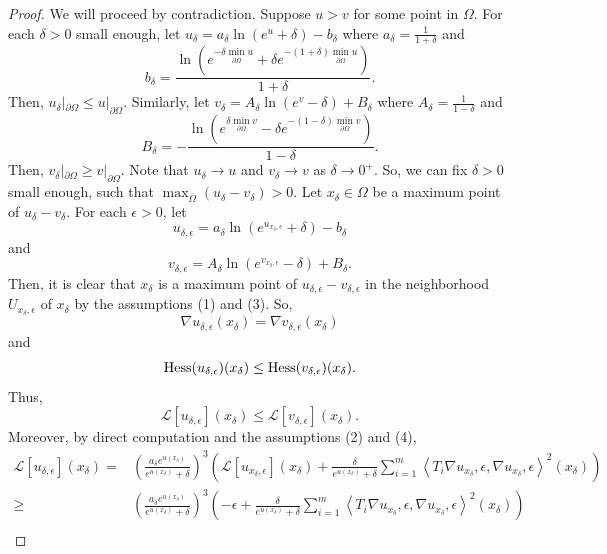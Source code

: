 \documentclass[12pt]{amsart}
\def\ol{\overline}
\def\e{\epsilon}
\def\p{\partial}
\def\ol{\overline}
\def\vv<#1,#2>{\left\langle#1,#2\right\rangle}
\theoremstyle{definition}
\theoremstyle{remark}
\numberwithin{equation}{section}
\def\Hess{{\rm Hess}}
\begin{document}
\begin{proof}We will proceed by contradiction. Suppose $u>v$ for some point in $\Omega$. For each $\delta>0$ small enough, let $u_\delta=a_\delta\ln(e^u+\delta)-b_\delta$ where $a_\delta=\frac{1}{1+\delta}$ and $$b_\delta=\frac{\ln(e^{-\delta\min_{\p\Omega}u}+\delta e^{-(1+\delta)\min_{\p\Omega}u})}{1+\delta}.$$
Then, $u_\delta|_{\p\Omega}\leq u|_{\p \Omega}$. Similarly, let $v_\delta=A_\delta\ln(e^v-\delta)+B_\delta$ where $A_\delta=\frac{1}{1-\delta}$ and
$$B_\delta=-\frac{\ln(e^{\delta\min_{\p\Omega}v}-\delta e^{-(1-\delta)\min_{\p\Omega}v})}{1-\delta}.$$
Then, $v_\delta|_{\p\Omega}\geq v|_{\p\Omega}$. Note that $u_\delta\to u$ and $v_\delta\to v$ as $\delta\to0^+$. So, we can fix $\delta>0$  small enough, such that $\max_{\ol\Omega}(u_\delta-v_\delta)>0$. Let $x_\delta\in\Omega$ be a maximum point of $u_\delta-v_\delta$. For each $\e>0$, let
\begin{equation}
u_{\delta,\e}=a_\delta\ln(e^{u_{x_\delta,\e}}+\delta)-b_\delta
\end{equation}
and
\begin{equation}
v_{\delta,\e}=A_\delta\ln(e^{v_{x_\delta,\e}}-\delta)+B_\delta.
\end{equation}
Then, it is clear that $x_\delta$ is a maximum point of $u_{\delta,\e}-v_{\delta,\e}$ in the neighborhood $U_{x_\delta,\e}$ of $x_\delta$ by the assumptions (1) and (3). So,
\begin{equation}
\nabla u_{\delta,\e}(x_\delta)=\nabla v_{\delta,\e}(x_\delta)
\end{equation}
and
\begin{equation}
\Hess(u_{\delta,\e})(x_\delta)\leq \Hess(v_{\delta,\e})(x_\delta).
\end{equation}
Thus,
\begin{equation}\label{eq-Lu-leq-Lv}
\mathscr{L}[u_{\delta,\e}](x_\delta)\leq \mathscr{L}[v_{\delta,\e}](x_\delta).
\end{equation}
Moreover, by direct computation and the assumptions (2) and (4),
\begin{equation}
\begin{split}
\mathscr{L}[u_{\delta,\e}](x_\delta)=&\left(\frac{a_\delta e^{u(x_\delta)}}{e^{u(x_\delta)}+\delta}\right)^3\left(\mathscr{L}[u_{x_\delta,\e}](x_\delta)+\frac{\delta}{e^{u(x_\delta)}+\delta}\sum_{i=1}^m\vv<T_i\nabla u_{x_\delta,\e},\nabla u_{x_\delta,\e}>^2(x_\delta)\right)\\
\geq&\left(\frac{a_\delta e^{u(x_\delta)}}{e^{u(x_\delta)}+\delta}\right)^3\left(-\e+\frac{\delta}{e^{u(x_\delta)}+\delta}\sum_{i=1}^m\vv<T_i\nabla u_{x_\delta,\e},\nabla u_{x_\delta,\e}>^2(x_\delta)\right)\\

\end{split}
\end{equation}
\end{proof}
\end{document}
